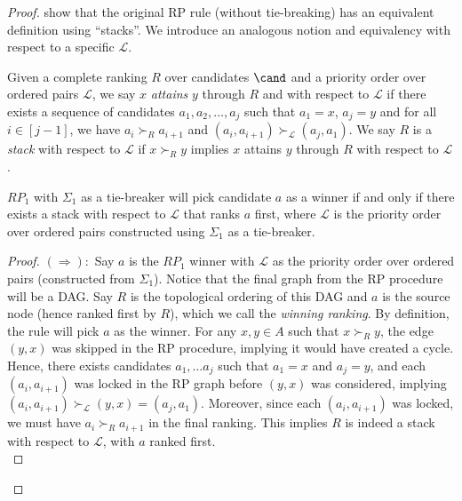 \begin{proof}
\citet{Zavist89:Complete} show that the original RP rule (without tie-breaking) has an equivalent definition using ``stacks''. We introduce an analogous notion and equivalency with respect to a specific $\mathcal{L}$.
\begin{definition} Given a complete ranking $R$ over candidates $\cand$ and a priority order over ordered pairs $\mathcal{L}$, we say $x$ \emph{attains} $y$ through $R$ and with respect to $\mathcal{L}$ if there exists a sequence of candidates $a_1,a_2,\ldots,a_j$ such that $a_1=x$, $a_j=y$ and for all $i \in [j-1]$, we have $a_i \succ_R a_{i+1}$ and $(a_i,a_{i+1}) \succ_{\mathcal{L}} (a_j , a_1)$. We say $R$ is a \emph{stack} with respect to $\mathcal{L}$ if $x \succ_R y$ implies $x$ attains $y$ through $R$ with respect to $\mathcal{L}$.
\end{definition}
\begin{lemma}\label{lemma:stack_winner}
    $RP_1$ with $\Sigma_1$ as a tie-breaker will pick candidate $a$ as a winner if and only if there exists a stack with respect to $\mathcal{L}$ that ranks $a$ first, where $\mathcal{L}$ is the priority order over ordered pairs constructed using $\Sigma_1$ as a tie-breaker.
\end{lemma}
\begin{proof}
    $(\Rightarrow):$ Say $a$ is the $RP_1$ winner with $\mathcal{L}$ as the priority order over ordered pairs (constructed from $\Sigma_1$). Notice that the final graph from the RP procedure will be a DAG. Say $R$ is the topological ordering of this DAG and $a$ is the source node (hence ranked first by $R$), which we call the \textit{winning ranking}. By definition, the rule will pick $a$ as the winner. For any $x,y\in A$ such that $x \succ_R y$, the edge $(y,x)$ was skipped in the RP procedure, implying it would have created a cycle. Hence, there exists candidates $a_1, \ldots a_j$ such that $a_1=x$ and $a_j=y$, and each $(a_i,a_{i+1})$ was locked in the RP graph before $(y,x)$ was considered, implying  $(a_i,a_{i+1}) \succ_\mathcal{L} (y,x)=(a_j,a_1)$. Moreover, since each $(a_i,a_{i+1})$ was locked, we must have $a_i \succ_R a_{i+1}$ in the final ranking. This implies $R$ is indeed a stack with respect to $\mathcal{L}$, with $a$ ranked first.\\

\end{proof}
\end{proof}
